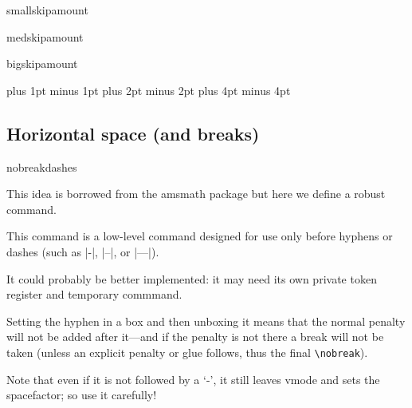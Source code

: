  
%    
 \begin{docCommand}{smallskipamount}{}
 \begin{docCommand}{medskipamount}{}
 \begin{docCommand}{bigskipamount}{}
    \begin{teX}
\newskip\smallskipamount \smallskipamount=3pt plus 1pt minus 1pt
\newskip\medskipamount   \medskipamount  =6pt plus 2pt minus 2pt
\newskip\bigskipamount   \bigskipamount =12pt plus 4pt minus 4pt
    \end{teX}
 \end{docCommand}
 \end{docCommand}
 \end{docCommand}
%
%
%
 \subsection{Horizontal space (and breaks)}
%
 \begin{docCommand}{nobreakdashes}{}
 \end{docCommand}
    This idea is borrowed from the \textsf{amsmath} package but
    here we define a robust command.

    This command is a low-level command designed for use only before 
    hyphens or dashes (such as |-|, |--|, or |---|).

    It could probably be better implemented: it may need its own
    private token register and temporary commmand.

    Setting the hyphen in a box and then unboxing it means that the
    normal penalty will not be added after it---and if the penalty is
    not there a break will not be taken (unless an explicit penalty
    or glue follows, thus the final \verb=\nobreak=).

    Note that even if it is not followed by a `-', it still leaves
    vmode and sets the spacefactor; so use it carefully!

    \begin{teX}
\DeclareRobustCommand{\nobreakdashes}{%
  \leavevmode
  \toks@{}%
  \def\reserved@a##1{\toks@\expandafter{\the\toks@-}%
                     \futurelet\@let@token \reserved@b}%
  \def\reserved@b   {\ifx\@let@token -%
                        \expandafter\reserved@a
                     \else
                       \setbox\z@ \hbox{\the\toks@\nobreak}%
                       \unhbox\z@
                       \spacefactor\sfcode`\-
                     \fi}%
  \futurelet\@let@token \reserved@b
}
    \end{teX}
 
